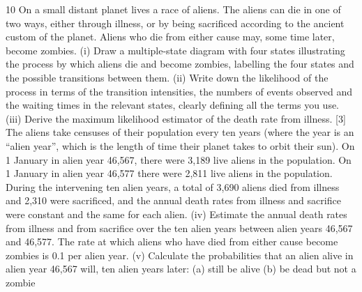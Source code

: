 \documentclass[a4paper,12pt]{article}
\begin{document}
10 On a small distant planet lives a race of aliens. The aliens can die in one of two ways,
either through illness, or by being sacrificed according to the ancient custom of the
planet. Aliens who die from either cause may, some time later, become zombies.
(i) Draw a multiple-state diagram with four states illustrating the process by
which aliens die and become zombies, labelling the four states and the
possible transitions between them. 
(ii) Write down the likelihood of the process in terms of the transition intensities,
the numbers of events observed and the waiting times in the relevant states,
clearly defining all the terms you use. 
(iii) Derive the maximum likelihood estimator of the death rate from illness. [3]
The aliens take censuses of their population every ten years (where the year is an
“alien year”, which is the length of time their planet takes to orbit their sun). On
1 January in alien year 46,567, there were 3,189 live aliens in the population. On 1
January in alien year 46,577 there were 2,811 live aliens in the population. During
the intervening ten alien years, a total of 3,690 aliens died from illness and 2,310 were
sacrificed, and the annual death rates from illness and sacrifice were constant and the
same for each alien.
(iv) Estimate the annual death rates from illness and from sacrifice over the ten
alien years between alien years 46,567 and 46,577. 
The rate at which aliens who have died from either cause become zombies is 0.1 per
alien year.
(v) Calculate the probabilities that an alien alive in alien year 46,567 will, ten
alien years later:
(a) still be alive
(b) be dead but not a zombie
\newpage

\end{document}
